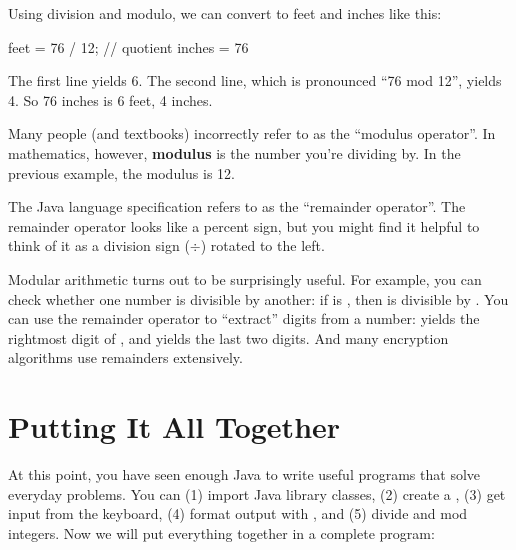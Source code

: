 Using division and modulo, we can convert to feet and inches like this:

\begin{code}
feet = 76 / 12;    // quotient
inches = 76 %
\end{code}

The first line yields 6.
The second line, which is pronounced ``76 mod 12'', yields 4.
So 76 inches is 6 feet, 4 inches.


Many people (and textbooks) incorrectly refer to \java{\%} as the ``modulus operator''.
In mathematics, however, {\bf modulus} is the number you're dividing by.
In the previous example, the modulus is 12.

The Java language specification refers to  \java{\%} as the ``remainder operator''.
The remainder operator looks like a percent sign, but you might find it helpful to think of it as a division sign ($\div$) rotated to the left.



Modular arithmetic turns out to be surprisingly useful.
For example, you can check whether one number is divisible by another: if  is , then  is divisible by .
You can use the remainder operator to ``extract'' digits from a number:  yields the rightmost digit of , and  yields the last two digits.
And many encryption algorithms use remainders extensively.


\section{Putting It All Together}

At this point, you have seen enough Java to write useful programs that solve everyday problems.
You can (1) import Java library classes, (2) create a , (3) get input from the keyboard, (4) format output with , and (5) divide and mod integers.
Now we will put everything together in a complete program:


